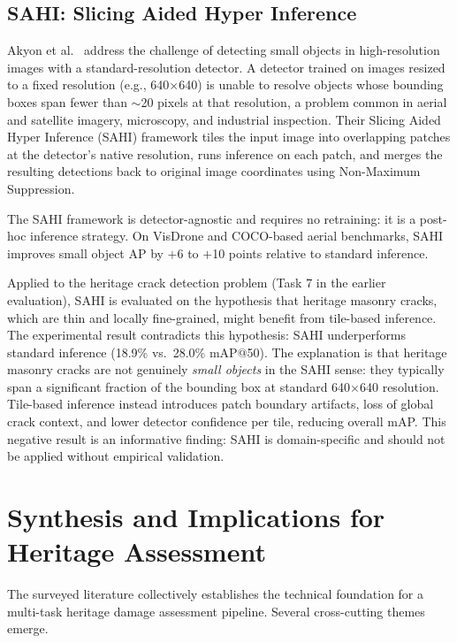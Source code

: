 \documentclass[12pt,a4paper]{article}
\begin{document}
\subsection{SAHI: Slicing Aided Hyper Inference}

Akyon et al.~\cite{surv:akyon2022sahi} address the challenge of detecting small objects in high-resolution images with a standard-resolution detector. A detector trained on images resized to a fixed resolution (e.g., 640$\times$640) is unable to resolve objects whose bounding boxes span fewer than $\sim$20 pixels at that resolution, a problem common in aerial and satellite imagery, microscopy, and industrial inspection. Their Slicing Aided Hyper Inference (SAHI) framework tiles the input image into overlapping patches at the detector's native resolution, runs inference on each patch, and merges the resulting detections back to original image coordinates using Non-Maximum Suppression.

The SAHI framework is detector-agnostic and requires no retraining: it is a post-hoc inference strategy. On VisDrone and COCO-based aerial benchmarks, SAHI improves small object AP by $+$6 to $+$10 points relative to standard inference.

Applied to the heritage crack detection problem (Task 7 in the earlier evaluation), SAHI is evaluated on the hypothesis that heritage masonry cracks, which are thin and locally fine-grained, might benefit from tile-based inference. The experimental result contradicts this hypothesis: SAHI underperforms standard inference (18.9\% vs.\ 28.0\% mAP@50). The explanation is that heritage masonry cracks are not genuinely \textit{small objects} in the SAHI sense: they typically span a significant fraction of the bounding box at standard 640$\times$640 resolution. Tile-based inference instead introduces patch boundary artifacts, loss of global crack context, and lower detector confidence per tile, reducing overall mAP. This negative result is an informative finding: SAHI is domain-specific and should not be applied without empirical validation.

\section{Synthesis and Implications for Heritage Assessment}
\label{surv:sec:synthesis}

The surveyed literature collectively establishes the technical foundation for a multi-task heritage damage assessment pipeline. Several cross-cutting themes emerge.
\end{document}

